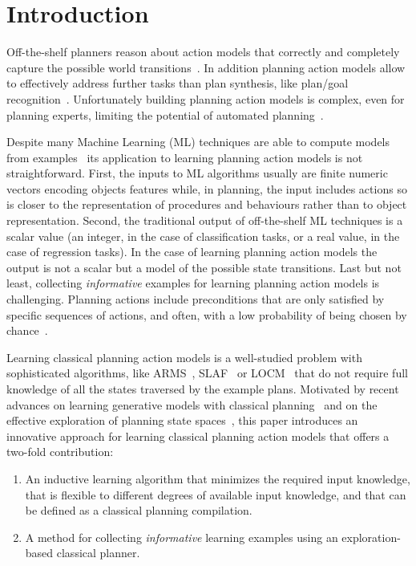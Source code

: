 \documentclass[letterpaper]{article} %
\begin{document}
\section{Introduction}
Off-the-shelf planners reason about action models that correctly and completely capture the possible world transitions~\cite{geffner:book:2013}. In addition planning action models allow to effectively address further tasks than plan synthesis, like plan/goal recognition~\cite{ramirez2010probabilistic}. Unfortunately building planning action models is complex, even for planning experts, limiting the potential of automated planning~\cite{kambhampati:modellite:AAAI2007}. 

Despite many Machine Learning (ML) techniques are able to compute models from examples~\cite{michalski2013machine} its application to learning planning action models is not straightforward. First, the inputs to ML algorithms usually are finite numeric vectors encoding objects features while, in planning, the input includes actions so is closer to the representation of procedures and behaviours rather than to object representation. Second, the traditional output of off-the-shelf ML techniques is a scalar value (an integer, in the case of classification tasks, or a real value, in the case of regression tasks). In the case of learning planning action models the output is not a scalar but a model of the possible state transitions. Last but not least, collecting {\em informative} examples for learning planning action models is challenging. Planning actions include preconditions that are only satisfied by specific sequences of actions, and often, with a low probability of being chosen by chance~\cite{fern2004learning}.

Learning classical planning action models is a well-studied problem with sophisticated algorithms, like ARMS~\cite{yang2007learning}, SLAF~\cite{amir:alearning:JAIR08} or LOCM~\cite{cresswell2013acquiring} that do not require full knowledge of all the states traversed by the example plans. Motivated by recent advances on learning generative models with classical planning~\cite{segovia2017generating} and on the effective exploration of planning state spaces~\cite{geffner:novelty:IJCAI17}, this paper introduces an innovative approach for learning classical planning action models that offers a two-fold contribution:
\begin{enumerate}
\item An inductive learning algorithm that minimizes the required input knowledge, that is flexible to different degrees of available input knowledge, and that can be defined as a classical planning compilation. 
\item A method for collecting {\em informative} learning examples using an exploration-based classical planner.
\end{enumerate}
\end{document}
